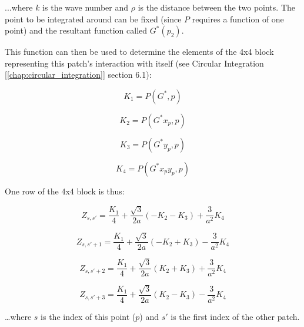 \documentclass[etd,twoside,senior,noacknowledgments]{BYUPhys}
\begin{document}
...where $k$ is the wave number and $\rho$ is the distance between the two points. The point to be integrated around can be fixed (since $P$ requires a function of one point) and the resultant function called $G^{*}\left(p_{2}\right)$.

This function can then be used to determine the elements of the 4x4 block representing this patch's interaction with itself (see Circular Integration [\ref{chap:circular_integration}] section 6.1):

\begin{equation}
  K_{1}=P\left(G^{*},p\right)
\end{equation}

\begin{equation}
  K_{2}=P\left(G^{*}x_{p},p\right)
\end{equation}

\begin{equation}
  K_{3}=P\left(G^{*}y_{p},p\right)
\end{equation}

\begin{equation}
  K_{4}=P\left(G^{*}x_{p}y_{p},p\right)
\end{equation}

One row of the 4x4 block is thus:

\begin{equation}
  Z_{s,s'}=\frac{K_{1}}{4}+\frac{\sqrt{3}}{2a}\left(-K_{2}-K_{3}\right)+\frac{3}{a^{2}}K_{4}
\end{equation}

\begin{equation}
  Z_{s,s'+1}=\frac{K_{1}}{4}+\frac{\sqrt{3}}{2a}\left(-K_{2}+K_{3}\right)-\frac{3}{a^{2}}K_{4}
\end{equation}

\begin{equation}
  Z_{s,s'+2}=\frac{K_{1}}{4}+\frac{\sqrt{3}}{2a}\left(K_{2}+K_{3}\right)+\frac{3}{a^{2}}K_{4}
\end{equation}

\begin{equation}
  Z_{s,s'+3}=\frac{K_{1}}{4}+\frac{\sqrt{3}}{2a}\left(K_{2}-K_{3}\right)-\frac{3}{a^{2}}K_{4}
\end{equation}

\ldots where $s$ is the index of this point ($p$) and $s'$ is the first index of the other patch.

\end{document}
